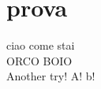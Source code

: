 \documentclass{article}
\begin{document}
    \section{prova}
        ciao come stai\\
        ORCO BOIO\\
        Another try! A! b!
\end{document}

